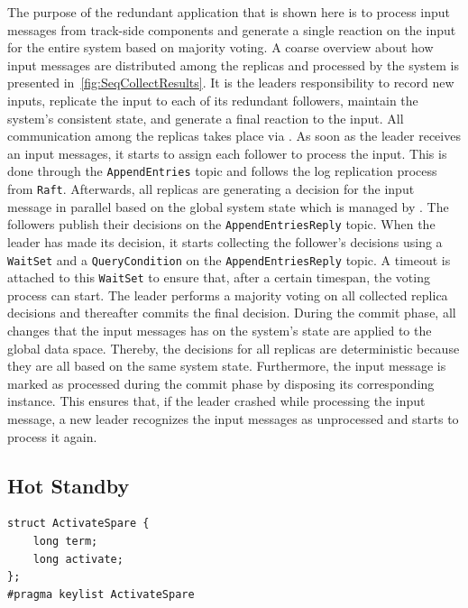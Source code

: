 The purpose of the redundant application that is shown here is to process input messages from track-side components and generate a single reaction on the input for the entire system based on majority voting.
A coarse overview about how input messages are distributed among the replicas and processed by the system is presented in~\autoref{fig:SeqCollectResults}.
It is the leaders responsibility to record new inputs, replicate the input to each of its redundant followers, maintain the system's consistent state, and generate a final reaction to the input.
All communication among the replicas takes place via .
As soon as the leader receives an input messages, it starts to assign each follower to process the input.
This is done through the \texttt{AppendEntries} topic and follows the log replication process from \texttt{Raft}.
Afterwards, all replicas are generating a decision for the input message in parallel based on the global system state which is managed by .
The followers publish their decisions on the \texttt{AppendEntriesReply} topic.
When the leader has made its decision, it starts collecting the follower's decisions using a \texttt{WaitSet} and a \texttt{QueryCondition} on the \texttt{AppendEntriesReply} topic.
A timeout is attached to this \texttt{WaitSet} to ensure that, after a certain timespan, the voting process can start.
The leader performs a majority voting on all collected replica decisions and thereafter commits the final decision.
During the commit phase, all changes that the input messages has on the system's state are applied to the global data space.
Thereby, the decisions for all replicas are deterministic because they are all based on the same system state.
Furthermore, the input message is marked as processed during the commit phase by disposing its corresponding  instance.
This ensures that, if the leader crashed while processing the input message, a new leader recognizes the input messages as unprocessed and starts to process it again.

\subsection{Hot Standby}
\begin{lstlisting}[caption={\abr{IDL} definition for the \texttt{ActivateSpare} topic. This topic is used to activate or deactivate spare replicas. The \texttt{term} field encodes the term in which the activate or deactivate call has been made and \texttt{activate} gets interpreted as a boolean that encodes whether the spare should be activated or deactivated.}, label=code:activateSpare]
struct ActivateSpare {
    long term;
    long activate;
};
#pragma keylist ActivateSpare
\end{lstlisting}

